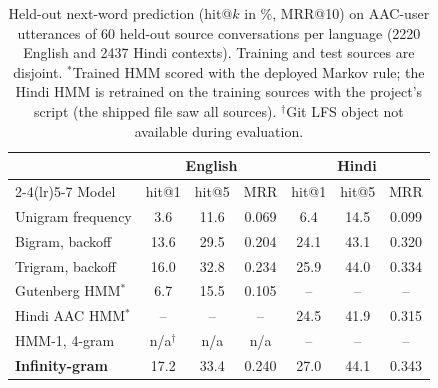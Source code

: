 \begin{table}[H]\centering\scriptsize\setlength{\tabcolsep}{2.4pt}
\begin{tabular}{@{}lcccccc@{}}
\toprule
 & \multicolumn{3}{c}{English} & \multicolumn{3}{c}{Hindi} \\
\cmidrule(lr){2-4}\cmidrule(lr){5-7}
Model & hit@1 & hit@5 & MRR & hit@1 & hit@5 & MRR \\
\midrule
Unigram frequency & 3.6 & 11.6 & 0.069 & 6.4 & 14.5 & 0.099 \\
Bigram, backoff & 13.6 & 29.5 & 0.204 & 24.1 & 43.1 & 0.320 \\
Trigram, backoff & 16.0 & 32.8 & 0.234 & 25.9 & 44.0 & 0.334 \\
Gutenberg HMM$^{\ast}$ & 6.7 & 15.5 & 0.105 & -- & -- & -- \\
Hindi AAC HMM$^{\ast}$ & -- & -- & -- & 24.5 & 41.9 & 0.315 \\
HMM-1, 4-gram & n/a$^{\dagger}$ & n/a & n/a & -- & -- & -- \\
\midrule
\textbf{Infinity-gram} & 17.2 & 33.4 & 0.240 & 27.0 & 44.1 & 0.343 \\
\bottomrule
\end{tabular}
\caption{Held-out next-word prediction (hit@$k$ in \%, MRR@10) on AAC-user utterances of 60 held-out source conversations per language (2220 English and 2437 Hindi contexts). Training and test sources are disjoint. $^{\ast}$Trained HMM scored with the deployed Markov rule; the Hindi HMM is retrained on the training sources with the project's script (the shipped file saw all sources). $^{\dagger}$Git LFS object not available during evaluation.}
\label{tab:pred}
\end{table}

